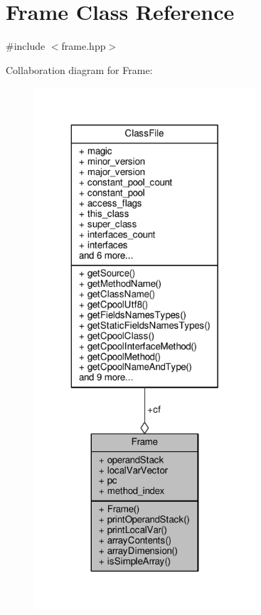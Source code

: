 \hypertarget{classFrame}{\section{Frame Class Reference}
\label{classFrame}
}


{\ttfamily \#include $<$frame.\+hpp$>$}



Collaboration diagram for Frame\+:
\nopagebreak
\begin{figure}[H]
\begin{center}
\leavevmode
\includegraphics[height=550pt]{classFrame__coll__graph}
\end{center}
\end{figure}
